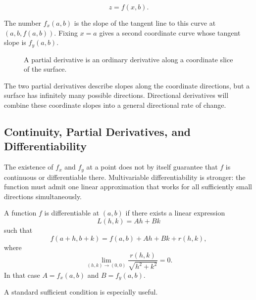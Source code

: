 \[
z=f(x,b).
\]

The number $f_x(a,b)$ is the slope of the tangent line to this curve at $(a,b,f(a,b))$. Fixing $x=a$ gives a second coordinate curve whose tangent slope is $f_y(a,b)$.

\begin{figure}[htbp]
\centering
{}
\caption{A partial derivative is an ordinary derivative along a coordinate slice of the surface.}
\label{fig:partial-coordinate-slice}
\end{figure}

The two partial derivatives describe slopes along the coordinate directions, but a surface has infinitely many possible directions. Directional derivatives will combine these coordinate slopes into a general directional rate of change.

\subsection{Continuity, Partial Derivatives, and Differentiability}

The existence of $f_x$ and $f_y$ at a point does not by itself guarantee that $f$ is continuous or differentiable there. Multivariable differentiability is stronger: the function must admit one linear approximation that works for all sufficiently small directions simultaneously.

\begin{bookdefinition}
A function $f$ is differentiable at $(a,b)$ if there exists a linear expression
\[
L(h,k)=Ah+Bk
\]
such that
\begin{equation}
f(a+h,b+k)
=
f(a,b)+Ah+Bk+r(h,k),
\label{eq:multivariable-differentiability}
\end{equation}
where
\[
\lim_{(h,k)\to(0,0)}
\frac{r(h,k)}{\sqrt{h^2+k^2}}=0.
\]
In that case $A=f_x(a,b)$ and $B=f_y(a,b)$.
\end{bookdefinition}

A standard sufficient condition is especially useful.

